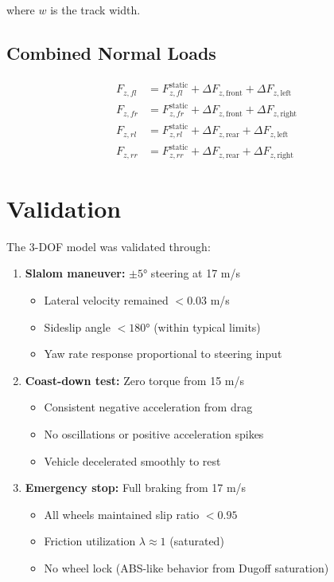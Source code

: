 \documentclass[11pt,a4paper]{article}
\begin{document}
where $w$ is the track width.

\subsection{Combined Normal Loads}

\begin{align}
F_{z,fl} &= F_{z,fl}^{\text{static}} + \Delta F_{z,\text{front}} + \Delta F_{z,\text{left}} \\
F_{z,fr} &= F_{z,fr}^{\text{static}} + \Delta F_{z,\text{front}} + \Delta F_{z,\text{right}} \\
F_{z,rl} &= F_{z,rl}^{\text{static}} + \Delta F_{z,\text{rear}} + \Delta F_{z,\text{left}} \\
F_{z,rr} &= F_{z,rr}^{\text{static}} + \Delta F_{z,\text{rear}} + \Delta F_{z,\text{right}}
\end{align}

\section{Validation}

The 3-DOF model was validated through:

\begin{enumerate}
    \item \textbf{Slalom maneuver:} $\pm 5°$ steering at 17 m/s
    \begin{itemize}
        \item Lateral velocity remained $< 0.03$ m/s
        \item Sideslip angle $< 180°$ (within typical limits)
        \item Yaw rate response proportional to steering input
    \end{itemize}

    \item \textbf{Coast-down test:} Zero torque from 15 m/s
    \begin{itemize}
        \item Consistent negative acceleration from drag
        \item No oscillations or positive acceleration spikes
        \item Vehicle decelerated smoothly to rest
    \end{itemize}

    \item \textbf{Emergency stop:} Full braking from 17 m/s
    \begin{itemize}
        \item All wheels maintained slip ratio $< 0.95$
        \item Friction utilization $\lambda \approx 1$ (saturated)
        \item No wheel lock (ABS-like behavior from Dugoff saturation)
    \end{itemize}
\end{enumerate}
\end{document}
